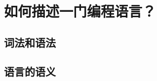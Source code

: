 \documentclass[../main.tex]{subfiles}
\begin{document}
  \section{如何描述一门编程语言？}

  \subsection{词法和语法}

  \subsection{语言的语义}

  \begin{thebibliography}{0}
  \end{thebibliography}
\end{document}
